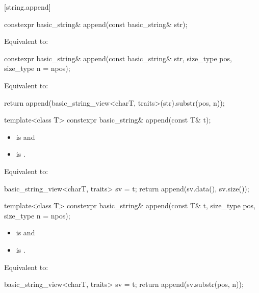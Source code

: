 [string.append]{}

%
\begin{itemdecl}
constexpr basic_string& append(const basic_string& str);
\end{itemdecl}

\begin{itemdescr}
\pnum
\effects
Equivalent to: 
\end{itemdescr}

%
\begin{itemdecl}
constexpr basic_string& append(const basic_string& str, size_type pos, size_type n = npos);
\end{itemdecl}

\begin{itemdescr}
\pnum
\effects
Equivalent to:
\begin{codeblock}
return append(basic_string_view<charT, traits>(str).substr(pos, n));
\end{codeblock}
\end{itemdescr}

%
\begin{itemdecl}
template<class T>
  constexpr basic_string& append(const T& t);
\end{itemdecl}

\begin{itemdescr}
\pnum
\constraints
\begin{itemize}
\item
{} is
 and
\item
{} is
.
\end{itemize}

\pnum
\effects
Equivalent to:
\begin{codeblock}
basic_string_view<charT, traits> sv = t;
return append(sv.data(), sv.size());
\end{codeblock}
\end{itemdescr}

%
\begin{itemdecl}
template<class T>
  constexpr basic_string& append(const T& t, size_type pos, size_type n = npos);
\end{itemdecl}

\begin{itemdescr}
\pnum
\constraints
\begin{itemize}
\item
{} is
 and
\item
{} is
.
\end{itemize}

\pnum
\effects
Equivalent to:
\begin{codeblock}
basic_string_view<charT, traits> sv = t;
return append(sv.substr(pos, n));
\end{codeblock}
\end{itemdescr}

